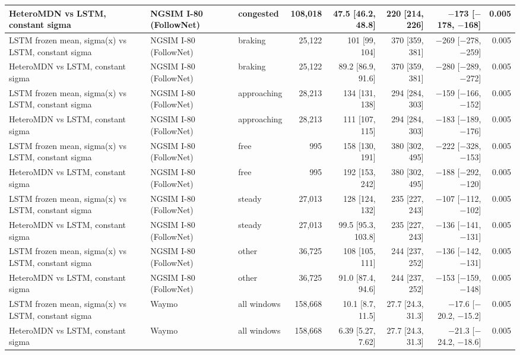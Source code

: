 \begin{longtable}{lllrrrrr}
\midrule
HeteroMDN vs LSTM, constant sigma & NGSIM I-80 (FollowNet) & congested & 108,018 & 47.5 [46.2, 48.8] & 220 [214, 226] & $-$173 [$-$178, $-$168] & 0.005 \\
\midrule
LSTM frozen mean, sigma(x) vs LSTM, constant sigma & NGSIM I-80 (FollowNet) & braking & 25,122 & 101 [99, 104] & 370 [359, 381] & $-$269 [$-$278, $-$259] & 0.005 \\
\midrule
HeteroMDN vs LSTM, constant sigma & NGSIM I-80 (FollowNet) & braking & 25,122 & 89.2 [86.9, 91.6] & 370 [359, 381] & $-$280 [$-$289, $-$272] & 0.005 \\
\midrule
LSTM frozen mean, sigma(x) vs LSTM, constant sigma & NGSIM I-80 (FollowNet) & approaching & 28,213 & 134 [131, 138] & 294 [284, 303] & $-$159 [$-$166, $-$152] & 0.005 \\
\midrule
HeteroMDN vs LSTM, constant sigma & NGSIM I-80 (FollowNet) & approaching & 28,213 & 111 [107, 115] & 294 [284, 303] & $-$183 [$-$189, $-$176] & 0.005 \\
\midrule
LSTM frozen mean, sigma(x) vs LSTM, constant sigma & NGSIM I-80 (FollowNet) & free & 995 & 158 [130, 191] & 380 [302, 495] & $-$222 [$-$328, $-$153] & 0.005 \\
\midrule
HeteroMDN vs LSTM, constant sigma & NGSIM I-80 (FollowNet) & free & 995 & 192 [153, 242] & 380 [302, 495] & $-$188 [$-$292, $-$120] & 0.005 \\
\midrule
LSTM frozen mean, sigma(x) vs LSTM, constant sigma & NGSIM I-80 (FollowNet) & steady & 27,013 & 128 [124, 132] & 235 [227, 243] & $-$107 [$-$112, $-$102] & 0.005 \\
\midrule
HeteroMDN vs LSTM, constant sigma & NGSIM I-80 (FollowNet) & steady & 27,013 & 99.5 [95.3, 103.8] & 235 [227, 243] & $-$136 [$-$141, $-$131] & 0.005 \\
\midrule
LSTM frozen mean, sigma(x) vs LSTM, constant sigma & NGSIM I-80 (FollowNet) & other & 36,725 & 108 [105, 111] & 244 [237, 252] & $-$136 [$-$142, $-$131] & 0.005 \\
\midrule
HeteroMDN vs LSTM, constant sigma & NGSIM I-80 (FollowNet) & other & 36,725 & 91.0 [87.4, 94.6] & 244 [237, 252] & $-$153 [$-$159, $-$148] & 0.005 \\
\midrule
LSTM frozen mean, sigma(x) vs LSTM, constant sigma & Waymo & all windows & 158,668 & 10.1 [8.7, 11.5] & 27.7 [24.3, 31.3] & $-$17.6 [$-$20.2, $-$15.2] & 0.005 \\
\midrule
HeteroMDN vs LSTM, constant sigma & Waymo & all windows & 158,668 & 6.39 [5.27, 7.62] & 27.7 [24.3, 31.3] & $-$21.3 [$-$24.2, $-$18.6] & 0.005 \\

\end{longtable}
